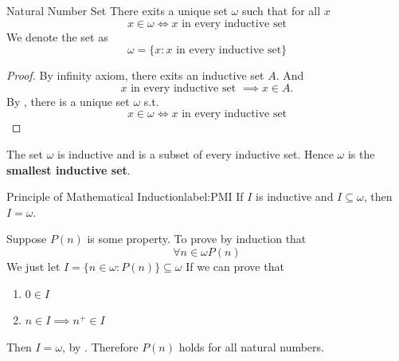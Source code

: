 \begin{definition}{Natural Number Set}{}
    There exits a unique set $\omega$ such that for all $x$
    \begin{equation*}
        x \in \omega \iff x \text{ in every inductive set}
    \end{equation*}
    We denote the set as 
    \begin{equation*}
        \omega = \{x : x \text{ in every inductive set}\}
    \end{equation*}
\end{definition}

\begin{proof}
    By infinity axiom, there exits an inductive set $A$. And
    \begin{equation*}
        x \text{ in every inductive set } \implies x \in A.
    \end{equation*}
    By , there is a unique set $\omega$ s.t.
    \begin{equation*}
        x \in \omega \iff x \text{ in every inductive set}
    \end{equation*}
\end{proof}

\begin{theorem}{}{}
    The set $\omega$ is inductive and is a subset of every inductive set. Hence $\omega$ is the \textbf{smallest inductive set}. 
\end{theorem}

\begin{corollary}{Principle of Mathematical Induction}{label:PMI}
    If $I$ is inductive and $I \subseteq \omega$, then $I = \omega$.
\end{corollary}
    
\begin{remarks}
    Suppose $P(n)$ is some property. To prove by induction that 
    \begin{equation*}
        \forall n \in \omega P(n)
    \end{equation*}
    We just let $I = \{n \in \omega : P(n)\} \subseteq \omega$ 
    If we can prove that 
    \begin{enumerate}

        \item $0 \in I$
        \item $n \in I \implies n^{+} \in I$

    \end{enumerate} 
    Then $I = \omega$, by . Therefore $P(n)$ holds
    for all natural numbers.
\end{remarks}

